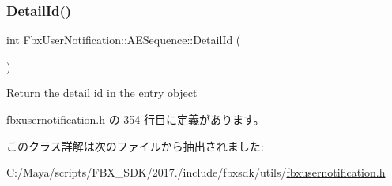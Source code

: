 \subsubsection{\texorpdfstring{Detail\+Id()}{DetailId()}}
{\footnotesize\ttfamily int Fbx\+User\+Notification\+::\+A\+E\+Sequence\+::\+Detail\+Id (\begin{DoxyParamCaption}{ }\end{DoxyParamCaption})\hspace{0.3cm}{\ttfamily [inline]}}



Return the detail id in the entry object 



 fbxusernotification.\+h の 354 行目に定義があります。



このクラス詳解は次のファイルから抽出されました\+:\begin{DoxyCompactItemize}
\item 
C\+:/\+Maya/scripts/\+F\+B\+X\+\_\+\+S\+D\+K/2017./include/fbxsdk/utils/\hyperlink{fbxusernotification_8h}{fbxusernotification.\+h}\end{DoxyCompactItemize}
